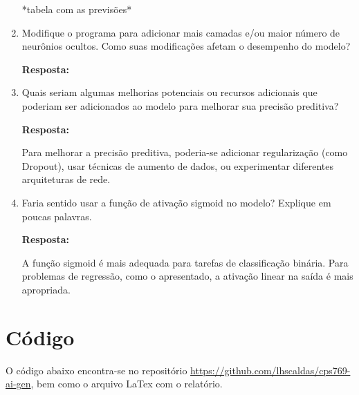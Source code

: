 \documentclass[12 pt]{article}
\begin{document}
\begin{enumerate}
    *tabela com as previsões*

    \item Modifique o programa para adicionar mais camadas e/ou maior número de neurônios ocultos. Como suas modificações afetam o desempenho do modelo?
    
       
    \textbf{Resposta:} \par

    \item Quais seriam algumas melhorias potenciais ou recursos adicionais que poderiam ser adicionados ao modelo para melhorar sua precisão preditiva?
    
       
    \textbf{Resposta:} \par

    Para melhorar a precisão preditiva, poderia-se adicionar regularização (como Dropout), usar técnicas de aumento de dados, ou experimentar diferentes arquiteturas de rede.

    \item Faria sentido usar a função de ativação sigmoid no modelo? Explique em poucas palavras.
       
    \textbf{Resposta:} \par

    A função sigmoid é mais adequada para tarefas de classificação binária. Para problemas de regressão, como o apresentado, a ativação linear na saída é mais apropriada.

\end{enumerate}

\section*{Código}

O código abaixo encontra-se no repositório \href{https://github.com/lhscaldas/cps769-ai-gen}{https://github.com/lhscaldas/cps769-ai-gen}, bem como o arquivo LaTex com o relatório.



\end{document}

